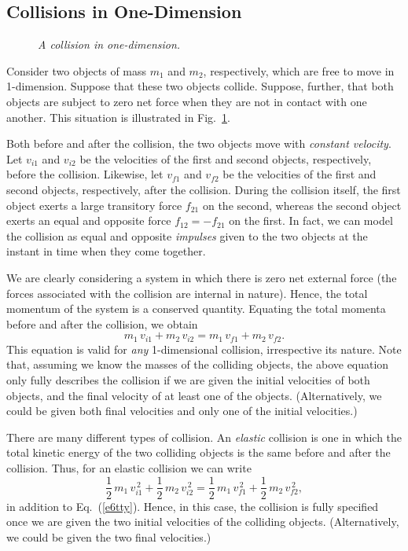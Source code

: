 \subsection{Collisions in One-Dimension}
\begin{figure}
\epsfysize=1.5in
\centerline{}
\caption{\em A collision in one-dimension.}\label{f55}  
\end{figure}
Consider two objects of mass $m_1$ and $m_2$, respectively, which are free
to move in 1-dimension. Suppose that these two objects collide.
Suppose, further, that both objects are subject to zero net force when they are
not in contact with one another. This situation is illustrated in Fig.~\ref{f55}.

Both before and after the collision, the two objects move with {\em constant velocity}.
Let $v_{i1}$ and $v_{i2}$ be the velocities of the first and second objects, respectively,
before the collision. Likewise, let  $v_{f1}$ and $v_{f2}$ be the velocities of 
the first and second objects, respectively,
after the collision. During the collision itself, the first object exerts a large
transitory force $f_{21}$ on the second, whereas the second object exerts an
equal and opposite force $f_{12}=-f_{21}$ on the first. In fact, we can model the collision
as equal and opposite {\em impulses} given to the two objects at the instant in time
when they come together.

We are clearly considering a system in which there is zero net external force (the forces
associated with the collision are internal in nature). Hence, the total momentum of the
system is a conserved quantity. Equating the total momenta before and after the
collision, we obtain
\begin{equation}\label{e6tty}
m_1\,v_{i1} + m_2\,v_{i2} = m_1\,v_{f1} + m_2\,v_{f2}.
\end{equation}
This equation is valid for {\em any} 1-dimensional
collision, irrespective its nature. Note that, assuming
we know the masses of the colliding objects, the above equation only fully describes the
collision if we are given the initial velocities of both objects, and the final velocity of
at least  one of the objects. (Alternatively, we could be given both final velocities and only
one of the initial velocities.)

There are many different types of collision. An {\em elastic} collision is one in which
the total kinetic energy of the two colliding objects is the same
before and after the collision. Thus, for an elastic collision we can write
\begin{equation}\label{e6ttt}
\frac{1}{2}\,m_1\,v_{i1}^{\,2} +\frac{1}{2}\,m_2\,v_{i2}^{\,2}=
\frac{1}{2}\,m_1\,v_{f1}^{\,2} +\frac{1}{2}\,m_2\,v_{f2}^{\,2},
\end{equation}
in addition to Eq.~(\ref{e6tty}). Hence, in this case, the collision is fully specified
once we are given the two initial velocities of the colliding objects. (Alternatively,
we could be given the two final velocities.)

